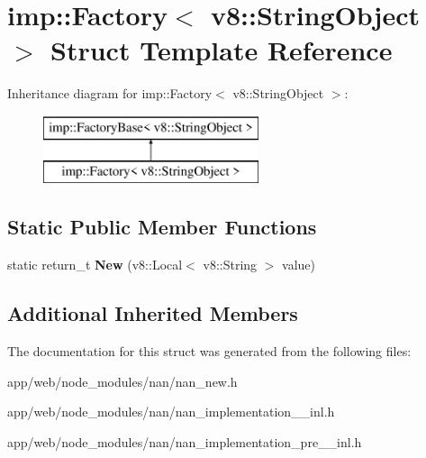 \hypertarget{structimp_1_1_factory_3_01v8_1_1_string_object_01_4}{}\section{imp\+:\+:Factory$<$ v8\+:\+:String\+Object $>$ Struct Template Reference}
\label{structimp_1_1_factory_3_01v8_1_1_string_object_01_4}
Inheritance diagram for imp\+:\+:Factory$<$ v8\+:\+:String\+Object $>$\+:\begin{figure}[H]
\begin{center}
\leavevmode
\includegraphics[height=2.000000cm]{structimp_1_1_factory_3_01v8_1_1_string_object_01_4}
\end{center}
\end{figure}
\subsection*{Static Public Member Functions}
\begin{DoxyCompactItemize}
\item 
\mbox{\label{structimp_1_1_factory_3_01v8_1_1_string_object_01_4_ae595cebfdd4e4cf07624b54f157c6207}} 
static return\+\_\+t {\bfseries New} (v8\+::\+Local$<$ v8\+::\+String $>$ value)
\end{DoxyCompactItemize}
\subsection*{Additional Inherited Members}


The documentation for this struct was generated from the following files\+:\begin{DoxyCompactItemize}
\item 
app/web/node\+\_\+modules/nan/nan\+\_\+new.\+h\item 
app/web/node\+\_\+modules/nan/nan\+\_\+implementation\+\_\+\_\+inl.\+h\item 
app/web/node\+\_\+modules/nan/nan\+\_\+implementation\+\_\+pre\+\_\+\_\+inl.\+h\end{DoxyCompactItemize}

